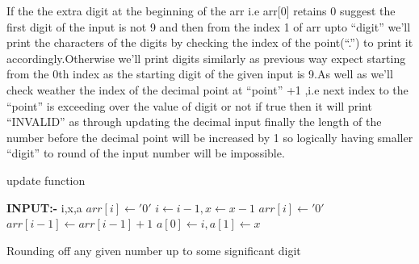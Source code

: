 \documentclass[conference]{IEEEtran}
\begin{document}
If the the extra digit at the beginning of the arr i.e arr[0] retains 0 suggest the first digit of the input is not 9 and then from the index 1 of arr upto “digit” we’ll print the characters of the digits by checking the index of the point(“.”) to print it accordingly.Otherwise we’ll print digits similarly as previous way expect starting from the 0th index as the starting digit of the given input is 9.As well as we’ll check weather the index of the decimal point at “point” +1 ,i.e next index to the “point” is exceeding over the value of digit or not if true then it will print “INVALID” as through updating the decimal input finally the length of the number before the decimal point will be increased by 1 so logically having smaller “digit” to round of the input number will be impossible.
\begin{algorithm}[H]
\begin{algorithmic}[1]
\caption{update function}
\State \textbf{INPUT:-} i,x,a
    \State $arr[i] \gets '0'$
    \State $i \gets i-1, x \gets x-1$
\EndWhile
\State $arr[i] \gets '0'$
\State $arr[i-1] \gets arr[i-1]+1$
\State $a[0] \gets i, a[1] \gets x$
\end{algorithmic}
\end{algorithm}
\begin{algorithm}[H]
\caption{Rounding off any given number up to some significant digit}
\end{algorithm}
\end{document}
